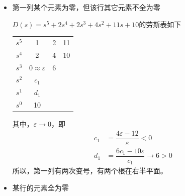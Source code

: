 \begin{itemize}
	\item 第一列某个元素为零，但该行其它元素不全为零

\examples $D(s) = s^5+2s^4 + 2s^3 + 4s^2 +11s+10$的劳斯表如下
\begin{center}
	\begin{tabular}{cccc}
		$s^5$ & 1 & 2 & 11 \\
		$s^4$ & 2 &4 & 10 \\
		$s^3$ & $0 \approx \varepsilon$ &6 &\\
		$s^2$ & $c_1$ &&\\
		$s^1$ & $d_1$ &&\\
		$s^0$ & 10 &&\\
	\end{tabular}
\end{center}
其中，$\varepsilon \to 0 $，即
\begin{align}
	c_1 &= \dfrac{4 \varepsilon - 12}{\varepsilon} < 0\\
	d_1 &= \dfrac{6 c_1 - 10\varepsilon}{c_1} \to 6 >0 
\end{align}
所以，第一列有两次变号，有两个根在右半平面。
	\item 某行的元素全为零


\end{itemize}

